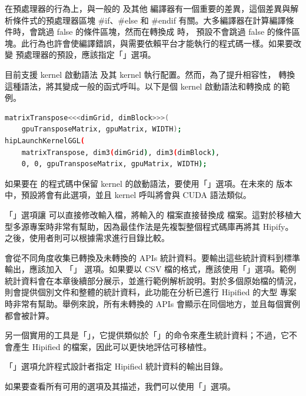  在預處理器的行為上，與一般的  及其他  編譯器有一個重要的差異，這個差異與解析條件式的預處理器區塊 \#if、\#else 和 \#endif 有關。大多編譯器在計算編譯條件時，會跳過 false 的條件區塊，然而在轉換成  時， 預設不會跳過 false 的條件區塊。此行為也許會使編譯錯誤，與需要依賴平台才能執行的程式碼一樣。如果要改變  預處理器的預設，應該指定「」選項。

 目前支援  kernel 啟動語法 \cite{nvidia2022cuda} 及其 kernel 執行配置。然而，為了提升相容性， 轉換這種語法，將其變成一般的函式呼叫。以下是個  kernel 啟動語法和轉換成  的範例。

\begin{lstlisting}[language=bash]
matrixTranspose<<<dimGrid, dimBlock>>>(
    gpuTransposeMatrix, gpuMatrix, WIDTH);
hipLaunchKernelGGL(
    matrixTranspose, dim3(dimGrid), dim3(dimBlock),
    0, 0, gpuTransposeMatrix, gpuMatrix, WIDTH);
\end{lstlisting}

如果要在  的程式碼中保留  kernel 的啟動語法，要使用「」選項。在未來的  版本中，預設將會有此選項，並且 kernel 呼叫將會與 CUDA 語法類似。

「」選項讓  可以直接修改輸入檔，將輸入的  檔案直接替換成  檔案。這對於移植大型多源專案時非常有幫助，因為最佳作法是先複製整個程式碼庫再將其 Hipify。之後，使用者則可以根據需求進行目錄比較。

 會從不同角度收集已轉換及未轉換的 APIs 統計資料。要輸出這些統計資料到標準輸出，應該加入 「」 選項。如果要以 CSV 檔的格式，應該使用「」選項。範例統計資料會在本章後續部分展示，並進行範例解析說明。對於多個原始檔的情況，則會提供個別文件和整體的統計資料，此功能在分析已進行 Hipified 的大型  專案時非常有幫助。舉例來說，所有未轉換的 APIs 會顯示在同個地方，並且每個實例都會被計算。

另一個實用的工具是「」，它提供類似於「」的命令來產生統計資料；不過，它不會產生 Hipified 的檔案，因此可以更快地評估可移植性。

「」選項允許程式設計者指定 Hipified 統計資料的輸出目錄。

如果要查看所有可用的選項及其描述，我們可以使用「」選項。

